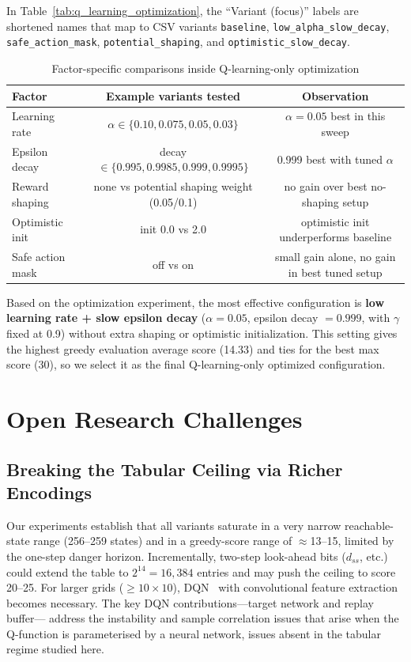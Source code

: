 \documentclass[10pt,conference]{IEEEtran}
\begin{document}
In Table~\ref{tab:q_learning_optimization}, the ``Variant (focus)''
labels are shortened names that map to CSV variants
\texttt{baseline}, \texttt{low\_alpha\_slow\_decay},
\texttt{safe\_action\_mask}, \texttt{potential\_shaping}, and
\texttt{optimistic\_slow\_decay}.

\begin{table}[h]
  \centering
  \caption{Factor-specific comparisons inside Q-learning-only optimization}
  \label{tab:q_learning_factor_breakdown}
  \begin{tabular}{lcc}
    \toprule
    Factor & Example variants tested & Observation \\
    \midrule
    Learning rate & $\alpha \in \{0.10,0.075,0.05,0.03\}$ & $\alpha{=}0.05$ best in this sweep \\
    Epsilon decay & decay $\in \{0.995,0.9985,0.999,0.9995\}$ & 0.999 best with tuned $\alpha$ \\
    Reward shaping & none vs potential shaping weight (0.05/0.1) & no gain over best no-shaping setup \\
    Optimistic init & init 0.0 vs 2.0 & optimistic init underperforms baseline \\
    Safe action mask & off vs on & small gain alone, no gain in best tuned setup \\
    \bottomrule
  \end{tabular}
\end{table}

Based on the optimization experiment, the most effective configuration
is \textbf{low learning rate + slow epsilon decay}
($\alpha{=}0.05$, epsilon decay $=0.999$, with $\gamma$ fixed at 0.9) without extra shaping or
optimistic initialization. This setting gives the highest greedy
evaluation average score (14.33) and ties for the best max score (30),
so we select it as the final Q-learning-only optimized configuration.

\section{Open Research Challenges}
\label{sec:challenges}

\subsection{Breaking the Tabular Ceiling via Richer Encodings}

Our experiments establish that all variants saturate in a very narrow
reachable-state range (256--259 states) and in a greedy-score range of
$\approx$13--15, limited by the one-step danger horizon.
Incrementally, two-step look-ahead bits ($d_{ss}$, etc.) could
extend the table to $2^{14}=16{,}384$ entries and may push the
ceiling to score 20--25.
For larger grids ($\geq10\times10$), DQN~\cite{mnih2015human}
with convolutional feature extraction becomes necessary.
The key DQN contributions---target network and replay buffer---
address the instability and sample correlation issues that arise
when the Q-function is parameterised by a neural network,
issues absent in the tabular regime studied here.
\end{document}
